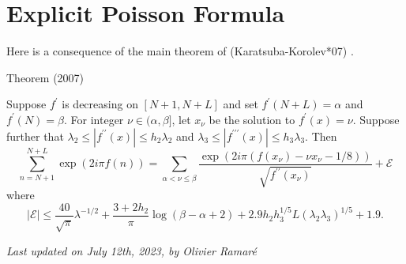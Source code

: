 \par 
\section{Explicit Poisson Formula}


Here is a consequence of the main theorem of
\bibref(Karatsuba-Korolev*07)
.
\par 
\begin{thm}{Theorem (2007)}

    Suppose $f^\prime$ is decreasing on $[N+1,N+L]$ and set
    $f^\prime(N+L)=\alpha$ and $f^\prime(N) = \beta$.
    For integer $\nu\in(\alpha, \beta]$, let $x_\nu$ be the solution
    to $f^\prime(x)=\nu$. Suppose further that
$\lambda_2\le |f^{\prime\prime}(x)|\le h_2\lambda_2$ and
    $\lambda_3\le |f^{\prime\prime\prime}(x)|\le h_3\lambda_3$. Then
    $$
    \sum_{n=N+1}^{N+L} \exp(2i\pi f(n))
    =
    \sum_{\alpha < \nu\le \beta}
		   \frac{\exp(2i\pi (f(x_\nu)-\nu x_\nu-1/8))}{\sqrt{f^{\prime\prime}(x_\nu)}}
		   +\mathcal{E}
    $$
		   where
		   $$
		   |\mathcal{E}|
		   \le \frac{40}{\sqrt{\pi}}\lambda^{-1/2}
		   + \frac{3+2h_2}{\pi} \log(\beta-\alpha+2)
		   + 2.9 h_2h_3^{1/5}L(\lambda_2\lambda_3)^{1/5}
		   +1.9.
		   $$
		   
\end{thm}








  
\begin{flushright}\small\sl{}   Last updated on July 12th, 2023, by Olivier Ramar\'e
 \end{flushright}















